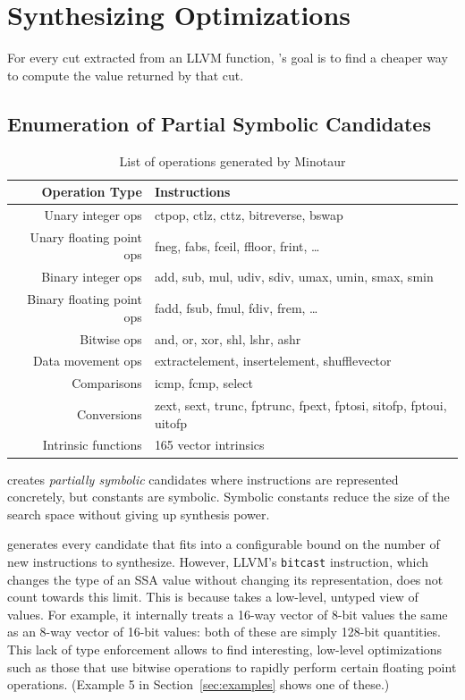 
\section{Synthesizing Optimizations}

For every cut extracted from an LLVM function, \minotaur{}'s goal is to
find a cheaper way to compute the value returned by that cut.


\subsection{Enumeration of Partial Symbolic Candidates}

\begin{table}[t]
  \centering
  \small
  \begin{tabular}{ r | l }
    \hline
    \textbf{Operation Type} & \textbf{Instructions} \\
    \hline \hline
    Unary integer ops & ctpop, ctlz, cttz, bitreverse, bswap \\
    Unary floating point ops & fneg, fabs, fceil, ffloor, frint, \dots \\
    Binary integer ops & add, sub, mul, udiv, sdiv, umax, umin, smax, smin\\
    Binary floating point ops & fadd, fsub, fmul, fdiv, frem, \dots \\
    Bitwise ops & and, or, xor, shl, lshr, ashr \\
    Data movement ops & extractelement, insertelement, shufflevector \\
    Comparisons & icmp, fcmp, select \\
    Conversions & zext, sext, trunc, fptrunc, fpext, fptosi, sitofp, fptoui, uitofp \\
    Intrinsic functions & 165 vector intrinsics \\
    \hline
  \end{tabular}
  \caption{List of operations generated by Minotaur}
  \label{tab:operations}
\end{table}


\minotaur{} creates \emph{partially symbolic} candidates where
instructions are represented concretely, but constants are symbolic.
%
Symbolic constants reduce the size of the search space without giving
up synthesis power.


\minotaur{} generates every candidate that fits into a configurable bound
on the number of new instructions to synthesize.
%
However, LLVM's \texttt{bitcast} instruction, which changes the type
of an SSA value without changing its representation, does not count
towards this limit.
%
This is because \minotaur{} takes a low-level, untyped view of values.
%
For example, it internally treats a 16-way vector of 8-bit values the
same as an 8-way vector of 16-bit values: both of these are simply
128-bit quantities.
%
This lack of type enforcement allows \minotaur{} to find interesting,
low-level optimizations such as those that use bitwise operations to
rapidly perform certain floating point operations.
%
(Example 5 in Section~\ref{sec:examples} shows one of these.)


